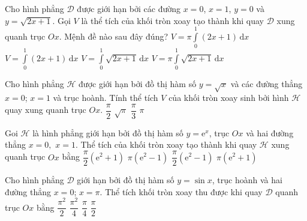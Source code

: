 \begin{ex}%
Cho hình phẳng $\mathscr{D}$ được giới hạn bởi các đường $x=0$, $x=1$, $y=0$ và $y=\sqrt{2x+1}$. Gọi $V$ là thể tích của khối tròn xoay tạo thành khi quay $\mathscr{D}$ xung quanh trục $Ox$. Mệnh đề nào sau đây đúng?
\choice
{\True $V=\pi\displaystyle\int\limits_0^1\left(2x+1\right)\mathrm{\,d}x$}
{$V=\displaystyle\int\limits_0^1\left(2x+1\right)\mathrm{\,d}x$}
{$V=\displaystyle\int\limits_0^1\sqrt{2x+1}\mathrm{\,d}x$}
{$V=\pi\displaystyle\int\limits_0^1\sqrt{2x+1}\mathrm{\,d}x$}
\end{ex}

 

 

\begin{ex}%
Cho hình phẳng $\mathscr{H}$ được giới hạn bởi đồ thị hàm số $y=\sqrt x $ và các đường thẳng $x=0$; $x=1$ và trục hoành. Tính thể tích $V$ của khối tròn xoay sinh bởi hình $\mathscr{H}$ quay xung quanh trục $Ox$.
\choice
{\True $\dfrac{\pi}{2}$}
{$\sqrt\pi $}
{$\dfrac{\pi}{3}$}
{$\pi $}
\end{ex}

\begin{ex}%
Goi $\mathscr{H}$ là hình phẳng giới hạn bởi đồ thị hàm số $y=\mathrm{e}^x$, trục $Ox$ và hai đường thẳng $x=0,$ $x=1$. Thể tích của khối tròn xoay tạo thành khi quay $\mathscr{H}$ xung quanh trục $Ox$ bằng
\choice
{$\dfrac{\pi}{2}\left(\mathrm{e}^2+1\right)$}
{$\pi\left(\mathrm{e}^2-1\right)$}
{\True $\dfrac{\pi}{2}\left(\mathrm{e}^2-1\right)$}
{$\pi\left(\mathrm{e}^2+1\right)$}
\end{ex}

 
\begin{ex}%
Cho hình phẳng $\mathscr{D}$ giới hạn bởi đồ thị hàm số $y=\sin x$, trục hoành và hai đường thẳng $x=0$; $x=\pi$. Thể tích khối tròn xoay thu được khi quay $\mathscr{D}$ quanh trục $Ox$ bằng
\choice
{\True $\dfrac{\pi^2}{2}$}
{$\dfrac{\pi^2}{4}$}
{$\dfrac{\pi}{4}$}
{$\dfrac{\pi}{2}$}
\end{ex}

